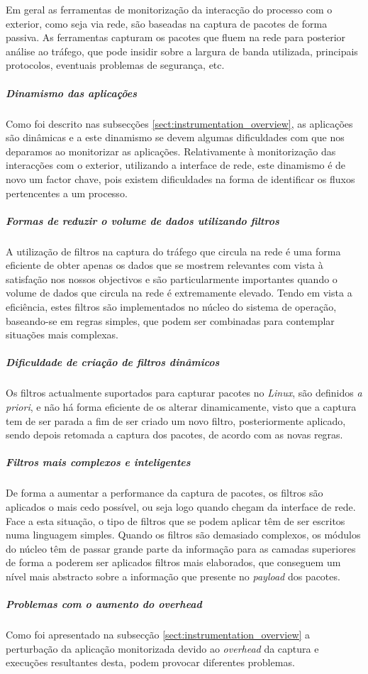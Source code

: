 Em geral as ferramentas de monitorização da interacção do processo com o exterior, como seja via rede, são baseadas na captura de pacotes de forma passiva.
As ferramentas capturam os pacotes que fluem na rede para posterior análise ao tráfego, que pode insidir sobre a largura de banda utilizada, principais protocolos, eventuais problemas de segurança, etc.

\subparagraph*{Dinamismo das aplicações}
Como foi descrito nas subsecções \ref{sect:instrumentation_overview}, as aplicações são dinâmicas e a este dinamismo se devem algumas dificuldades com que nos deparamos ao monitorizar as aplicações.
Relativamente à monitorização das interacções com o exterior, utilizando a interface de rede, este dinamismo é de novo um factor chave, pois existem dificuldades na forma de identificar os fluxos pertencentes a um processo.

\subparagraph*{Formas de reduzir o volume de dados utilizando filtros}
A utilização de filtros  na captura do tráfego que circula na rede é uma forma eficiente de obter apenas os dados que se mostrem relevantes com vista à satisfação nos nossos objectivos e são particularmente importantes quando o volume de dados que circula na rede é extremamente elevado.
Tendo em vista a eficiência, estes filtros são implementados no núcleo do sistema de operação, baseando-se em regras simples, que podem ser combinadas para contemplar situações mais complexas.

\subparagraph*{Dificuldade de criação de filtros dinâmicos}
Os filtros actualmente suportados para capturar pacotes no \textit{Linux}, são definidos \textit{a priori}, e não há forma eficiente de os alterar dinamicamente, visto que a captura tem de ser parada a fim de ser criado um novo filtro, posteriormente aplicado, sendo depois retomada a captura dos pacotes, de acordo com as novas regras.

\subparagraph*{Filtros mais complexos e inteligentes}
De forma a aumentar a performance da captura de pacotes, os filtros são aplicados o mais cedo possível, ou seja logo quando chegam da interface de rede.
Face a esta situação, o tipo de filtros que se podem aplicar têm de ser escritos numa linguagem simples.
Quando os filtros são demasiado complexos, os módulos do núcleo têm de passar grande parte da informação para as camadas superiores de forma a poderem ser aplicados filtros mais elaborados, que conseguem um nível mais abstracto sobre a informação que presente no \textit{payload} dos pacotes.

\subparagraph*{Problemas com o aumento do overhead}
Como foi apresentado na subsecção \ref{sect:instrumentation_overview} a perturbação da aplicação monitorizada devido ao \textit{overhead} da captura e execuções resultantes desta, podem provocar diferentes problemas.

